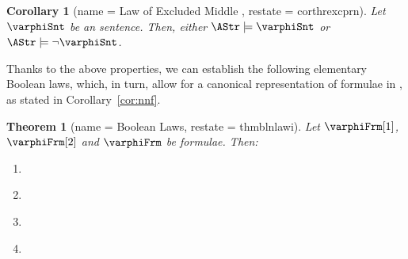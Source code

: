 \documentclass[authoryear]{elsarticle}
\newtheorem{theorem}{Theorem}
\newtheorem{corollary}{Corollary}
\begin{document}
\begin{corollary}[name = Law of Excluded Middle , restate = corthrexcprn]
  \label{cor:lawexcmid}
  Let $\varphiSnt$ be an \ADIF sentence.
  Then, either $\AStr \models \varphiSnt$ or $\AStr \models \neg
  \varphiSnt$.
\end{corollary}

Thanks to the above properties, we can establish the following elementary
Boolean laws, which, in turn, allow for a canonical representation of formulae
in \nnf, as stated in Corollary~\ref{cor:nnf}.

\begin{theorem}[name = Boolean Laws, restate = thmblnlawi]
  \label{thm:blnlawi}
  Let $\varphiFrm[1]$, $\varphiFrm[2]$ and $\varphiFrm$ be \ADIF formulae.
  Then:
  \begin{enumerate}[1)]
    \item\label{thm:blnlawi(neg)}
      \begin{inparaenum}[a)]
        \item\label{thm:blnlawi(neg:fbv)}
          $\neg \Ff \equiv \Tt$;
        \hfill
        \item\label{thm:blnlawi(neg:tbv)}
          $\neg \Tt \equiv \Ff$;
        \hfill
        \item\label{thm:blnlawi(neg:inv)}
          $\varphiFrm \equiv \neg \neg \varphiFrm$;
      \end{inparaenum}
    \item\label{thm:blnlawi(conbln)}
      \begin{inparaenum}[a)]
        \item\label{thm:blnlawi(conbln:ann)}
          $\varphiFrm \LCon \Ff \equiv \Ff \LCon \varphiFrm \equiv \Ff$;
        \hfill
        \item\label{thm:blnlawi(conbln:idn)}
          $\varphiFrm \LCon \Tt \equiv \Tt \LCon \varphiFrm \equiv \varphiFrm$;
      \end{inparaenum}
    \item\label{thm:blnlawi(disbln)}
      \begin{inparaenum}[a)]
        \item\label{thm:blnlawi(disbln:ann)}
          $\varphiFrm \LDis \Tt \equiv \Tt \LDis \varphiFrm \equiv \Tt$;
        \hfill
        \item\label{thm:blnlawi(disbln:idn)}
          $\varphiFrm \LDis \Ff \equiv \Ff \LDis \varphiFrm \equiv \varphiFrm$;
      \end{inparaenum}
    \item\label{thm:blnlawi(com)}

\end{enumerate}
\end{theorem}
\end{document}
